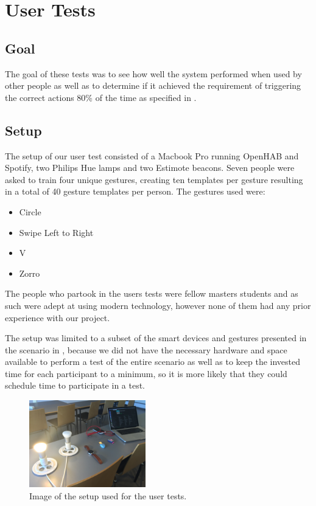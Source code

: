 \section{User Tests}
\label{sec:evaluation:user-tests}

\subsection{Goal}

The goal of these tests was to see how well the system performed when used by other people as well as to determine if it achieved the requirement of triggering the correct actions 80\% of the time as specified in .

\subsection{Setup}
\label{sec:evaluation:user-tests-setup}

The setup of our user test consisted of a Macbook Pro running OpenHAB and Spotify, two Philips Hue lamps and two Estimote beacons.
Seven people were asked to train four unique gestures, creating ten templates per gesture resulting in a total of 40 gesture templates per person.
The gestures used were:

\begin{itemize}
  \item Circle
  \item Swipe Left to Right
  \item V
  \item Zorro
\end{itemize}

The people who partook in the users tests were fellow masters students and as such were adept at using modern technology, however none of them had any prior experience with our project.

The setup was limited to a subset of the smart devices and gestures presented in the scenario in , because we did not have the necessary hardware and space available to perform a test of the entire scenario as well as to keep the invested time for each participant to a minimum, so it is more likely that they could schedule time to participate in a test.

\begin{figure}[h]
\centering
\includegraphics[width=0.45\textwidth]{images/user-test-setup.jpg}
\caption{Image of the setup used for the user tests.}
\label{fig:user-test-setup-image}
\end{figure}

